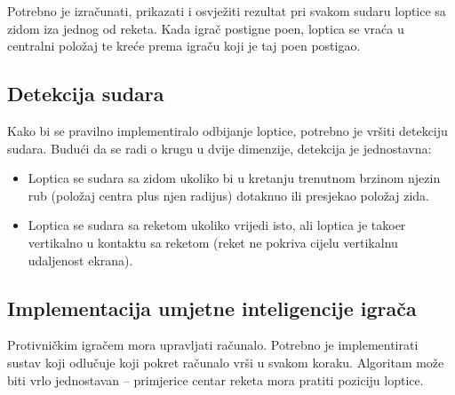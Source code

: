 \documentclass[10pt,a4paper]{article}
\begin{document}
Potrebno je izra\v{c}unati, prikazati i osvje\v{z}iti rezultat pri svakom sudaru loptice sa zidom iza jednog od reketa. Kada igra\v{c} postigne poen, loptica se vra\'{c}a u centralni polo\v{z}aj te kre\'{c}e prema igra\v{c}u koji je taj poen postigao.

\subsection{Detekcija sudara}

Kako bi se pravilno implementiralo odbijanje loptice, potrebno je vr\v{s}iti detekciju sudara. Budu\'{c}i da se radi o krugu u dvije dimenzije, detekcija je jednostavna:

\begin{itemize}
	\item Loptica se sudara sa zidom ukoliko bi u kretanju trenutnom brzinom njezin rub (polo\v{z}aj centra plus njen radijus) dotaknuo ili presjekao polo\v{z}aj zida.
	\item Loptica se sudara sa reketom ukoliko vrijedi isto, ali loptica je tako\dj{}er vertikalno u kontaktu sa reketom (reket ne pokriva cijelu vertikalnu udaljenost ekrana).
\end{itemize}

\subsection{Implementacija umjetne inteligencije igra\v{c}a}

Protivni\v{c}kim igra\v{c}em mora upravljati ra\v{c}unalo. Potrebno je implementirati sustav koji odlu\v{c}uje koji pokret ra\v{c}unalo vr\v{s}i u svakom koraku. Algoritam mo\v{z}e biti vrlo jednostavan -- primjerice centar reketa mora pratiti poziciju loptice.
\end{document}
